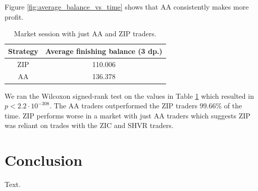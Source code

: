 \documentclass[preprint]{acm_proc_article-sp} %
\begin{document}
Figure \ref{fig:average_balance_vs_time} shows that AA consistently makes more profit.

\begin{table}[H]
  \centering
  \begin{tabular}{ | c | c | }
    \hline
    Strategy & Average finishing balance (3 dp.) \\
    \hline
    ZIP & 110.006 \\
    AA & 136.378 \\
    \hline
  \end{tabular}
  \caption{Market session with just AA and ZIP traders.}
  \label{tbl:two_traders}
\end{table}

We ran the Wilcoxon signed-rank test on the values in Table
\ref{tbl:two_traders} which resulted in $p < 2.2 \cdot 10^{-308}$. The AA
traders outperformed the ZIP traders 99.66\% of the time. ZIP performs worse in
a market with just AA traders which suggests ZIP was reliant on trades with the
ZIC and SHVR traders.


\section{Conclusion} \label{sec:conclusion}
Text.\\



\end{document}
